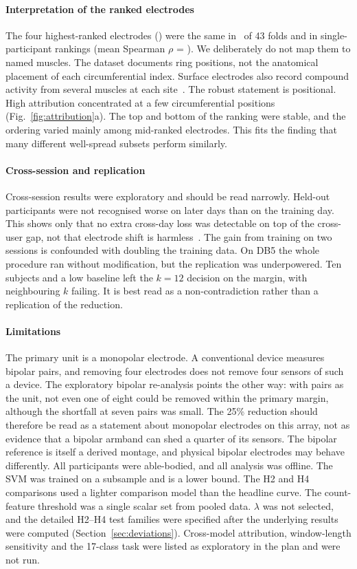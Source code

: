 \paragraph{Interpretation of the ranked electrodes}
The four highest-ranked electrodes (\TopFourSet) were the same in \TopFourFolds\ of 43 folds and in single-participant rankings (mean Spearman $\rho$ = \StabSubjRho). We deliberately do not map them to named muscles. The dataset documents ring positions, not the anatomical placement of each circumferential index. Surface electrodes also record compound activity from several muscles at each site~\cite{farina2004extraction}. The robust statement is positional. High attribution concentrated at a few circumferential positions (Fig.~\ref{fig:attribution}a). The top and bottom of the ranking were stable, and the ordering varied mainly among mid-ranked electrodes. This fits the finding that many different well-spread subsets perform similarly.

\paragraph{Cross-session and replication}
Cross-session results were exploratory and should be read narrowly. Held-out participants were not recognised worse on later days than on the training day. This shows only that no extra cross-day loss was detectable on top of the cross-user gap, not that electrode shift is harmless~\cite{hargrove2006effect,kaufmann2010fluctuating,vidovic2016improving}. The gain from training on two sessions is confounded with doubling the training data. On DB5 the whole procedure ran without modification, but the replication was underpowered. Ten subjects and a low baseline left the $k = 12$ decision on the margin, with neighbouring $k$ failing. It is best read as a non-contradiction rather than a replication of the reduction.

\paragraph{Limitations}
The primary unit is a monopolar electrode. A conventional device measures bipolar pairs, and removing four electrodes does not remove four sensors of such a device. The exploratory bipolar re-analysis points the other way: with pairs as the unit, not even one of eight could be removed within the primary margin, although the shortfall at seven pairs was small. The 25\% reduction should therefore be read as a statement about monopolar electrodes on this array, not as evidence that a bipolar armband can shed a quarter of its sensors. The bipolar reference is itself a derived montage, and physical bipolar electrodes may behave differently. All participants were able-bodied, and all analysis was offline. The SVM was trained on a subsample and is a lower bound. The H2 and H4 comparisons used a lighter comparison model than the headline curve. The count-feature threshold was a single scalar set from pooled data. $\lambda$ was not selected, and the detailed H2--H4 test families were specified after the underlying results were computed (Section~\ref{sec:deviations}). Cross-model attribution, window-length sensitivity and the 17-class task were listed as exploratory in the plan and were not run.
